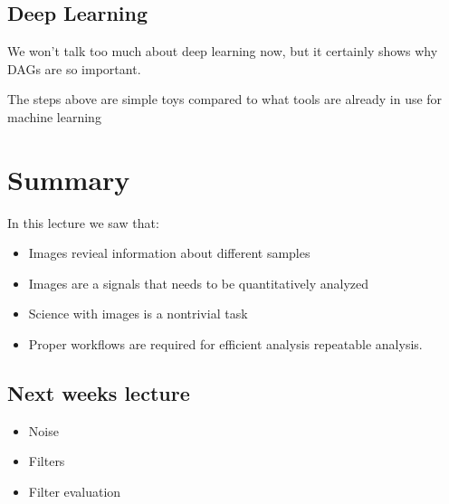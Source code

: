\documentclass[letterpaper,10pt,english]{sphinxmanual}
\begin{document}
\noindent{}


\section{Deep Learning}
\label{\detokenize{01-Introduction:deep-learning}}
\sphinxAtStartPar
We won’t talk too much about deep learning now, but it certainly shows why DAGs are so important.

\sphinxAtStartPar
{}

\sphinxAtStartPar
The steps above are simple toys compared to what tools are already in use for machine learning

\sphinxAtStartPar
{}


\chapter{Summary}
\label{\detokenize{01-Introduction:summary}}
\sphinxAtStartPar
In this lecture we saw that:
\begin{itemize}
\item {} 
\sphinxAtStartPar
Images revieal information about different samples

\item {} 
\sphinxAtStartPar
Images are a signals that needs to be quantitatively analyzed

\item {} 
\sphinxAtStartPar
Science with images is a non\sphinxhyphen{}trivial task

\item {} 
\sphinxAtStartPar
Proper workflows are required for efficient analysis repeatable analysis.

\end{itemize}


\section{Next weeks lecture}
\label{\detokenize{01-Introduction:next-weeks-lecture}}\begin{itemize}
\item {} 
\sphinxAtStartPar
Noise

\item {} 
\sphinxAtStartPar
Filters

\item {} 
\sphinxAtStartPar
Filter evaluation

\end{itemize}







\renewcommand{\indexname}{Index}
\printindex
\end{document}
